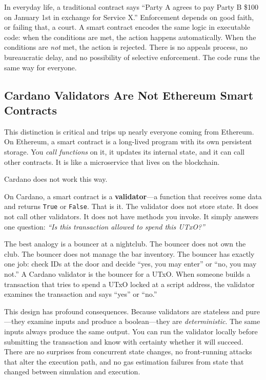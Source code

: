 In everyday life, a traditional contract says ``Party A agrees to pay
Party B \$100 on January 1st in exchange for Service X.'' Enforcement
depends on good faith, or failing that, a court. A smart contract
encodes the same logic in executable code: when the conditions are met,
the action happens automatically. When the conditions are \emph{not}
met, the action is rejected. There is no appeals process, no
bureaucratic delay, and no possibility of selective enforcement. The
code runs the same way for everyone.

\subsection{Cardano Validators Are Not Ethereum Smart Contracts}

This distinction is critical and trips up nearly everyone coming from
Ethereum. On Ethereum, a smart contract is a long-lived program with
its own persistent storage. You \emph{call functions} on it, it
updates its internal state, and it can call other contracts. It is
like a microservice that lives on the blockchain.

Cardano does not work this way.

On Cardano, a smart contract is a \textbf{validator}---a function that
receives some data and returns \texttt{True} or \texttt{False}. That is
it. The validator does not store state. It does not call other
validators. It does not have methods you invoke. It simply answers one
question: \emph{``Is this transaction allowed to spend this UTxO?''}

The best analogy is a bouncer at a nightclub. The bouncer does not own
the club. The bouncer does not manage the bar inventory. The bouncer
has exactly one job: check IDs at the door and decide ``yes, you may
enter'' or ``no, you may not.'' A Cardano validator is the bouncer for
a UTxO. When someone builds a transaction that tries to spend a UTxO
locked at a script address, the validator examines the transaction and
says ``yes'' or ``no.''

This design has profound consequences. Because validators are stateless
and pure---they examine inputs and produce a boolean---they are
\emph{deterministic}. The same inputs always produce the same output.
You can run the validator locally before submitting the transaction and
know with certainty whether it will succeed. There are no surprises
from concurrent state changes, no front-running attacks that alter the
execution path, and no gas estimation failures from state that changed
between simulation and execution.

